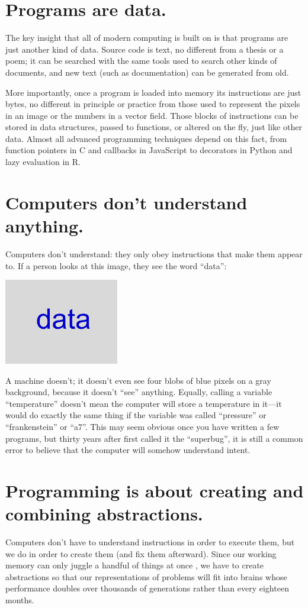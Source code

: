 \documentclass[10pt,letterpaper]{article}
\newcommand{\rulemajor}[1]{\section{#1}}
\begin{document}
\rulemajor{Programs are data.}

The key insight that all of modern computing is built on is that programs are
just another kind of data.  Source code is text, no different from a thesis or a
poem; it can be searched with the same tools used to search other kinds of
documents, and new text (such as documentation) can be generated from old.

More importantly, once a program is loaded into memory its instructions are just
bytes, no different in principle or practice from those used to represent the
pixels in an image or the numbers in a vector field.  Those blocks of
instructions can be stored in data structures, passed to functions, or altered
on the fly, just like other data.  Almost all advanced programming techniques
depend on this fact, from function pointers in C and callbacks in JavaScript to
decorators in Python and lazy evaluation in R.

\rulemajor{Computers don't understand anything.}

Computers don't understand: they only obey instructions that make them appear
to.  If a person looks at this image, they see the word ``data'':

\includegraphics[width=5.0cm]{data.png}

\noindent
A machine doesn't; it doesn't even see four blobs of blue pixels on a gray
background, because it doesn't ``see'' anything.  Equally, calling a variable
``temperature'' doesn't mean the computer will store a temperature in it---it
would do exactly the same thing if the variable was called ``pressure'' or
``frankenstein'' or ``a7''.  This may seem obvious once you have written a few
programs, but thirty years after \cite{Pea1986} first called it the
``superbug'', it is still a common error to believe that the computer will
somehow understand intent.

\rulemajor{Programming is about creating and combining abstractions.}

Computers don't have to understand instructions in order to execute them, but we
do in order to create them (and fix them afterward).  Since our working memory
can only juggle a handful of things at once \cite{Mill1956}, we have to create
abstractions so that our representations of problems will fit into brains whose
performance doubles over thousands of generations rather than every eighteen
months.
\end{document}
